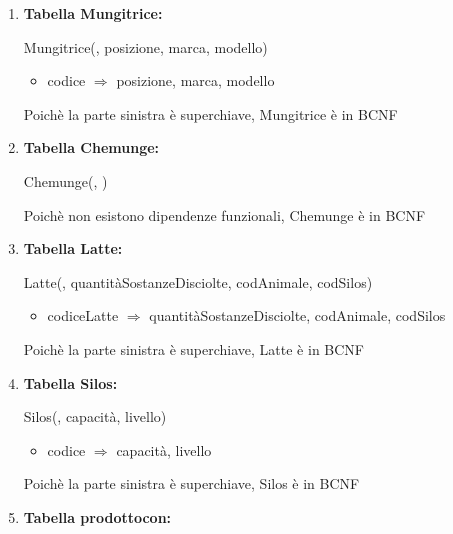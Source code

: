 \documentclass[12pt,a4paper]{article}
\begin{document}
\begin{enumerate}
\item[] \textbf{Tabella Mungitrice:}

Mungitrice(\underline{}, posizione, marca, modello)
\begin{itemize}
\vspace{-5pt}
\item codice $\Rightarrow$ posizione, marca, modello
\vspace{-5pt}
\end{itemize}
Poichè la parte sinistra è superchiave, Mungitrice è in BCNF
\vspace{10pt}



\item[] \textbf{Tabella Chemunge:}

Chemunge(\underline{}, \underline{})

Poichè non esistono dipendenze funzionali, Chemunge è in BCNF
\vspace{10pt}



\item[] \textbf{Tabella Latte:}

Latte(\underline{}, quantitàSostanzeDisciolte,  codAnimale,  codSilos)
\begin{itemize}
\vspace{-5pt}
\item codiceLatte $\Rightarrow$ quantitàSostanzeDisciolte, codAnimale, codSilos
\vspace{-5pt}
\end{itemize}
Poichè la parte sinistra è superchiave, Latte è in BCNF
\vspace{10pt}



\item[] \textbf{Tabella Silos:}

Silos(\underline{}, capacità, livello)
\begin{itemize}
\vspace{-5pt}
\item codice $\Rightarrow$ capacità, livello
\vspace{-5pt}
\end{itemize}
Poichè la parte sinistra è superchiave, Silos è in BCNF
\vspace{10pt}



\item[] \textbf{Tabella prodottocon:}


\end{enumerate}
\end{document}
